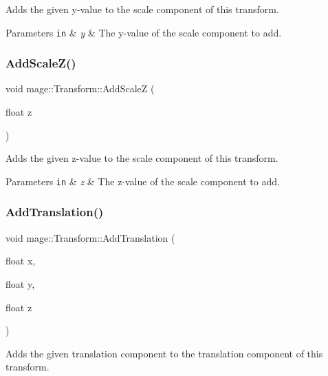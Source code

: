 Adds the given y-\/value to the scale component of this transform.


\begin{DoxyParams}[1]{Parameters}
\mbox{\tt in}  & {\em y} & The y-\/value of the scale component to add. \\
\hline
\end{DoxyParams}
\hypertarget{structmage_1_1_transform_aa493f3a588376d094ce50dfcffe0ece2}{}\label{structmage_1_1_transform_aa493f3a588376d094ce50dfcffe0ece2} 
\subsubsection{\texorpdfstring{Add\+Scale\+Z()}{AddScaleZ()}}
{\footnotesize\ttfamily void mage\+::\+Transform\+::\+Add\+ScaleZ (\begin{DoxyParamCaption}\item[{float}]{z }\end{DoxyParamCaption})}

Adds the given z-\/value to the scale component of this transform.


\begin{DoxyParams}[1]{Parameters}
\mbox{\tt in}  & {\em z} & The z-\/value of the scale component to add. \\
\hline
\end{DoxyParams}
\hypertarget{structmage_1_1_transform_a2e981e670eea4d731bda4ee68f0b7fae}{}\label{structmage_1_1_transform_a2e981e670eea4d731bda4ee68f0b7fae} 
\subsubsection{\texorpdfstring{Add\+Translation()}{AddTranslation()}\hspace{0.1cm}{\footnotesize\ttfamily [1/2]}}
{\footnotesize\ttfamily void mage\+::\+Transform\+::\+Add\+Translation (\begin{DoxyParamCaption}\item[{float}]{x,  }\item[{float}]{y,  }\item[{float}]{z }\end{DoxyParamCaption})}

Adds the given translation component to the translation component of this transform.


